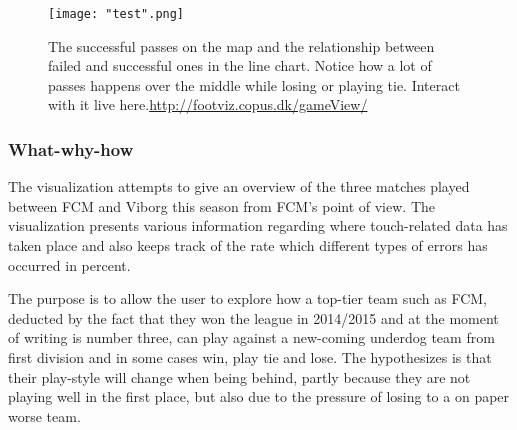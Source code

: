 \documentclass[Report.tex]{subfiles}
\begin{document}
 

\begin{figure}
	\center
	\texttt{[image: "test".png]}
	\caption{The successful passes on the map and the relationship between failed and successful ones in the line chart. Notice how a lot of passes happens over the middle while losing or playing tie. Interact with it live here.\url{http://footviz.copus.dk/gameView/}}
	\label{Fig:}
\end{figure}


\subsubsection{What-why-how}
The visualization attempts to give an overview of the three matches played between FCM and Viborg this season from FCM's point of view. The visualization presents various information regarding where touch-related data has taken place and also keeps track of the rate which different types of errors has occurred in percent.

The purpose is to allow the user to explore how a top-tier team such as FCM, deducted by the fact that they won the league in 2014/2015 and at the moment of writing is number three, can play against a new-coming underdog team from first division and in some cases win, play tie and lose. The hypothesizes is that their play-style will change when being behind, partly because they are not playing well in the first place, but also due to the pressure of losing to a on paper worse team.
\end{document}
